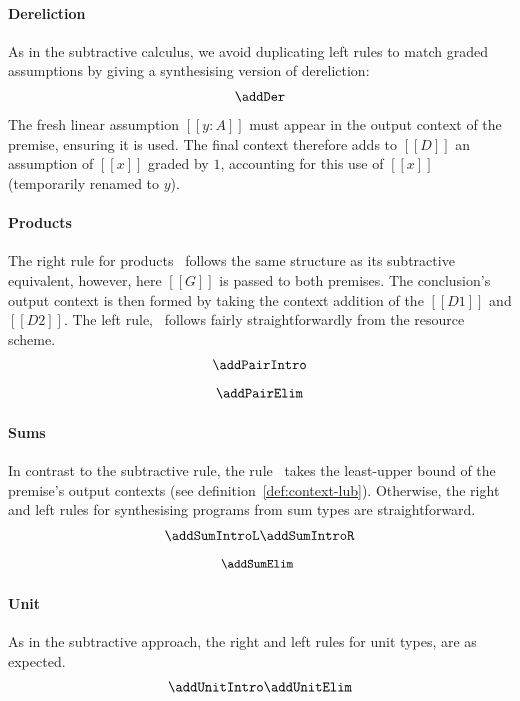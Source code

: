\paragraph{Dereliction}
As in the subtractive calculus,
we avoid duplicating left rules to
match graded assumptions by giving a synthesising version of dereliction:
\begin{align*}
  \addDer
  \end{align*}
%
The fresh linear assumption $[[ y : A ]]$ must
appear in the output context of the premise, ensuring it is used. The final
context therefore adds to $[[ D ]]$ an assumption of $[[x]]$ graded by
$1$, accounting for this use of $[[ x ]]$ (temporarily renamed to
$y$).

\paragraph{Products}
The right rule for products \addPairIntroName\ follows the same structure as its
subtractive equivalent, however, here $[[ G ]]$ is passed to both premises.
The conclusion's output context is then formed by taking the context addition of
the $[[ D1 ]]$ and $[[ D2 ]]$. The left rule, \addPairElimName\ follows fairly
straightforwardly from the resource scheme.
\begin{align*}
\begin{array}{c}
  \addPairIntro
\\[0.8em]
  \addPairElim
\end{array}
  \end{align*}

\paragraph{Sums}
In contrast to the subtractive rule, the rule \addSumElimName\ takes the least-upper bound of
the premise's output contexts (see definition~\ref{def:context-lub}). Otherwise,
the right and left rules for synthesising programs from sum types are straightforward.
\begin{align*}
\begin{array}{c}
  \addSumIntroL
  \addSumIntroR
\\[0.8em]
{\small{\!\!\addSumElim}}
\end{array}
  \end{align*}

\paragraph{Unit}
As in the subtractive approach, the right and left rules for unit types, are
as expected.
\begin{align*}
\begin{array}{c}
  \addUnitIntro
  \addUnitElim
\end{array}
  \end{align*}


